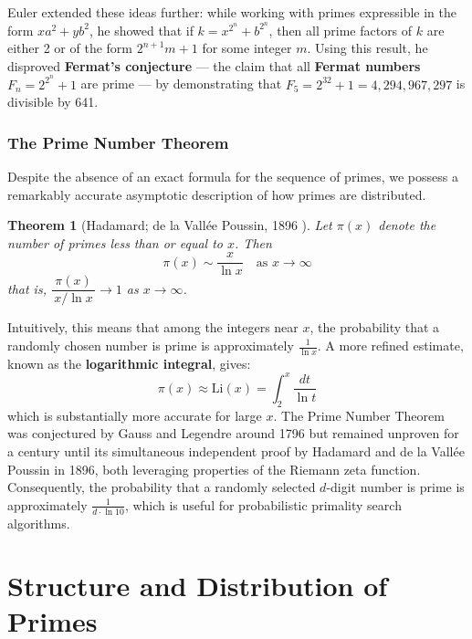 \documentclass[11pt]{article}
\theoremstyle{plain}
\newtheorem{theorem}{Theorem}
\theoremstyle{definition}
\theoremstyle{remark}
\begin{document}
\par Euler extended these ideas further: while working with primes expressible in the form $xa^2 + yb^2$, he showed that if $k = x^{2^n} + b^{2^n}$, then all prime factors of $k$ are either 2 or of the form $2^{n+1}m + 1$ for some integer $m$. Using this result, he disproved \textbf{Fermat's conjecture} — the claim that all \textbf{Fermat numbers} $F_n = 2^{2^n} + 1$ are prime — by demonstrating that $F_5 = 2^{32} + 1 = 4{,}294{,}967{,}297$ is divisible by 641.

\subsubsection{The Prime Number Theorem}

\par Despite the absence of an exact formula for the sequence of primes, we possess a remarkably accurate asymptotic description of how primes are distributed.

\begin{theorem}[Hadamard; de la Vall\'{e}e Poussin, 1896 \cite{hadamard_pnt_1896,delavallee_pnt_1896,wiki_pnt}]
	\label{thm:prmthm}
	Let $\pi(x)$ denote the number of primes less than or equal to $x$. Then
	$$\pi(x) \sim \frac{x}{\ln x} \quad \text{as } x \to \infty$$
	that is, $\dfrac{\pi(x)}{\,x/\ln x\,} \to 1$ as $x \to \infty$.
\end{theorem}

\par Intuitively, this means that among the integers near $x$, the probability that a randomly chosen number is prime is approximately $\frac{1}{\ln x}$. A more refined estimate, known as the \textbf{logarithmic integral}, gives:
$$\pi(x) \approx \mathrm{Li}(x) = \int_2^x \frac{dt}{\ln t}$$
which is substantially more accurate for large $x$. The Prime Number Theorem was conjectured by Gauss and Legendre around 1796 but remained unproven for a century until its simultaneous independent proof by Hadamard and de la Vall\'{e}e Poussin in 1896, both leveraging properties of the Riemann zeta function. Consequently, the probability that a randomly selected $d$-digit number is prime is approximately $\frac{1}{d \cdot \ln 10}$, which is useful for probabilistic primality search algorithms.

\section{Structure and Distribution of Primes}
\end{document}
